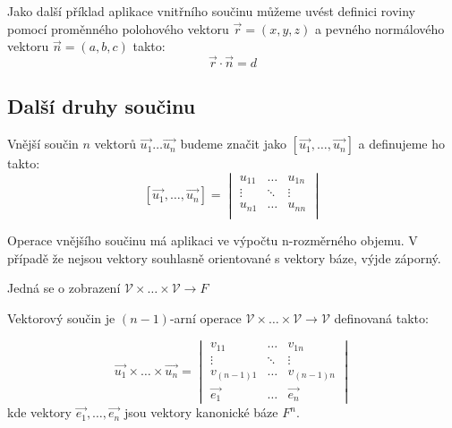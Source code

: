 Jako další příklad aplikace vnitřního součinu můžeme uvést definici roviny pomocí
proměnného polohového vektoru $\vec{r} = (x, y, z)$ a pevného normálového vektoru
$\vec{n} = (a, b, c)$ takto:
$$\vec{r} \cdot \vec{n} = d$$

\subsection{Další druhy součinu}
\begin{definition}
    Vnější součin $n$ vektorů $\vec{u_1} \ldots \vec{u_n}$ budeme značit jako
    $[\vec{u_1}, \ldots, \vec{u_n}]$ a definujeme ho takto:
    \[
        [\vec{u_1}, \ldots, \vec{u_n}] =
        \begin{vmatrix}
            u_{11} & \ldots & u_{1n}\\
            \vdots & \ddots & \vdots\\
            u_{n1} & \ldots & u_{nn}\\
        \end{vmatrix}
    \]

    Operace vnějšího součinu má aplikaci ve výpočtu n-rozměrného objemu. V případě
    že nejsou vektory souhlasně orientované s vektory báze, výjde záporný.

    Jedná se o zobrazení $\mathcal{V} \times \ldots \times \mathcal{V} \rightarrow F$
\end{definition}

\begin{definition}
    Vektorový součin je $(n-1)$-arní operace $\mathcal{V} \times \ldots \times \mathcal{V}
    \rightarrow \mathcal{V}$ definovaná takto:

    \[
      \vec{u_1} \times \ldots \times \vec{u_n} =
      \begin{vmatrix}
        v_{11} & \ldots & v_{1n} \\
        \vdots & \ddots & \vdots \\
        v_{(n-1)1} & \ldots & v_{(n-1)n} \\
        \vec{e_1} & \ldots & \vec{e_n}
      \end{vmatrix}
    \]
    kde vektory $\vec{e_1}, \ldots, \vec{e_n}$ jsou vektory kanonické báze $F^n$.
\end{definition}


